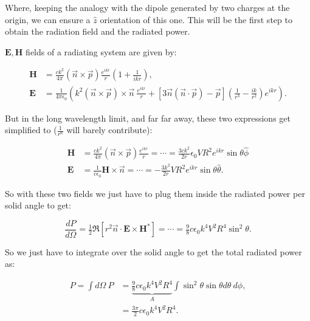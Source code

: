 Where, keeping the analogy with the dipole generated by two charges at the origin, we can ensure a $\hat{z}$ orientation of this one. This will be the first step to obtain the radiation field and the radiated power.

$\mathbf{E,H}$ fields of a radiating system are given by:

\begin{equation}
	\begin{split}
		\mathbf{H} &= \frac{c k^{2}}{4\pi}(\vec{n}\times \vec{p})\frac{e^{ikr}}{r}\left(1 + \frac{1}{ikr}\right),\\
		\mathbf{E} &= \frac{1}{4\pi \epsilon_{0}}\left(k^{2}(\vec{n}\times \vec{p})\times \vec{n}\: \frac{e^{ikr}}{r} + \left[3\vec{n}(\vec{n}\cdot\vec{p})-\vec{p}\right]\left(\tfrac{1}{r^{3}}- \tfrac{ik}{r^{2}}\right) e^{ikr}\right).
	\end{split}
\end{equation}

But in the long wavelength limit, and far far away, these two expressions get simplified to ($\tfrac{1}{r^{n}}$ will barely contribute):

\begin{equation}
	\begin{split}
		\mathbf{H} &= \frac{c k^{2}}{4\pi}(\vec{n}\times \vec{p})\frac{e^{ikr}}{r} =\cdots= \tfrac{3 c k^{2}}{2 r} \epsilon_{0} V R^{2} e^{ikr} \sin\theta \hat{\phi}\\
		\mathbf{E} &= \frac{1}{c \epsilon_{0}} \mathbf{H} \times \vec{n} =\cdots= -\tfrac{3k^{2}}{2r} V R^{2} e^{ikr} \sin \theta \hat{\theta}.
	\end{split}
\end{equation}

So with these two fields we just have to plug them inside the radiated power per solid angle to get:

\begin{equation}
	\frac{dP}{d\Omega} = \tfrac{1}{2} \Re \left[r^{2} \vec{n}\cdot \mathbf{E} \times \mathbf{H}^{*}\right] =\cdots = \tfrac{9}{8} c\epsilon_{0}k^{4}V^{2} R^{4} \sin^{2} \theta.
\end{equation}

So we just have to integrate over the solid angle to get the total radiated power as:

\begin{equation}
	\begin{split}
		P= \int d\Omega \: P &=  \underbrace{\tfrac{9}{8} c\epsilon_{0}k^{4}V^{2} R^{4}}_{A} \int \sin^{2} \theta \sin\theta d\theta \: d\phi,\\
		&= \frac{3\pi}{2}c\epsilon_{0}k^{4}V^{2} R^{4}.
	\end{split}
\end{equation}



